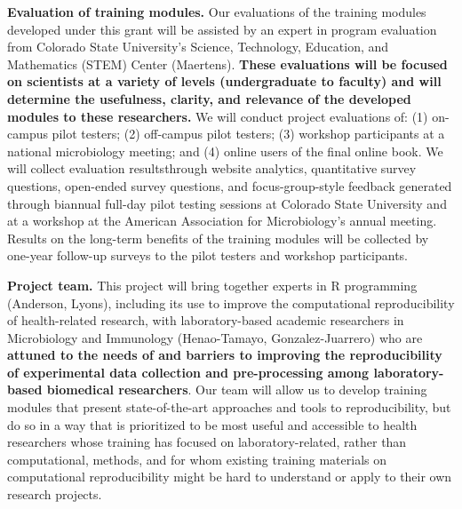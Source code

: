 \documentclass[pdftex,english,11pt,parskip=half]{scrartcl}
\begin{document}
\textbf{Evaluation of training modules.} Our evaluations of the training modules developed under this grant will be assisted by an expert in program evaluation from Colorado State University's Science, Technology, Education, and Mathematics (STEM) Center (Maertens). \textbf{These evaluations will be focused on scientists at a variety of levels (undergraduate to faculty) and will determine the usefulness, clarity, and relevance of the developed modules to these researchers.} We will conduct project evaluations of: (1) on-campus pilot testers; (2) off-campus pilot testers; (3) workshop participants at a national microbiology meeting; and (4) online users of the final online book. We will collect evaluation resultsthrough website analytics, quantitative survey questions, open-ended survey questions, and focus-group-style feedback generated through biannual full-day pilot testing sessions at Colorado State University and at a workshop at the American Association for Microbiology's annual meeting. Results on the long-term benefits of the training modules will be collected by one-year follow-up surveys to the pilot testers and workshop participants.


\textbf{Project team.}  This project will bring together experts in R programming (Anderson, Lyons), including its use to improve the computational reproducibility of health-related research, with laboratory-based academic researchers in Microbiology and Immunology (Henao-Tamayo, Gonzalez-Juarrero) who are \textbf{attuned to the needs of and barriers to improving the reproducibility of experimental data collection and pre-processing among laboratory-based biomedical researchers}. Our team will allow us to develop training modules that present state-of-the-art approaches and tools to reproducibility, but do so in a way that is prioritized to be most useful and accessible to health researchers whose training has focused on laboratory-related, rather than computational, methods, and for whom existing training materials on computational reproducibility might be hard to understand or apply to their own research projects. 

\endgroup
\end{document}
